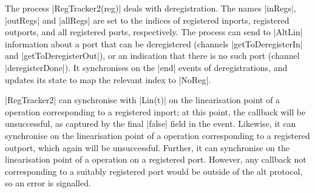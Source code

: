 

The process |RegTracker2(reg)| deals with deregistration.  The names |inRegs|,
|outRegs| and |allRegs| are set to the indices of registered inports,
registered outports, and all registered ports, respectively.  The process can
send to |AltLin| information about a port that can be deregistered (channels
|getToDeregisterIn| and |getToDeregisterOut|), or an indication that there is
no such port (channel |deregisterDone|).  It synchronises on the |end| events
of deregistrations, and updates its state to map the relevant index to
|NoReg|.

|RegTracker2| can synchronise with |Lin(t)| on the linearisation point of a
 operation corresponding to a registered inport; at this
point, the callback will be unsuccessful, as captured by the final |false|
field in the event.  Likewise, it can synchronise on the linearisation point
of a  operation corresponding to a registered outport, which
again will be unsuccessful.  Further, it can synchronise on the linearisation
point of a  operation on a registered port.  However, any
callback not corresponding to a suitably registered port would be outside of
the alt protocol, so an error is signalled. 



